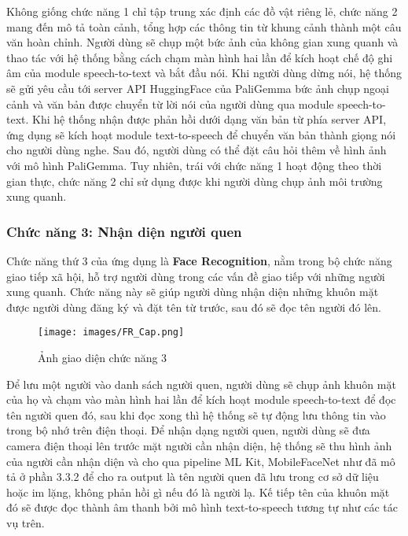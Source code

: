 \documentclass[a4paper,12pt]{article}
\begin{document}
Không giống chức năng 1 chỉ tập trung xác định các đồ vật riêng lẻ, chức năng 2 mang đến mô tả toàn cảnh, tổng hợp các thông tin từ khung cảnh thành một câu văn hoàn chỉnh. Người dùng sẽ chụp một bức ảnh của không gian xung quanh và thao tác với hệ thống bằng cách chạm màn hình hai lần để kích hoạt chế độ ghi âm của module speech-to-text và bắt đầu nói. Khi người dùng dừng nói, hệ thống sẽ gửi yêu cầu tới server API HuggingFace của PaliGemma bức ảnh chụp ngoại cảnh và văn bản được chuyển từ lời nói của người dùng qua module speech-to-text. Khi hệ thống nhận được phản hồi dưới dạng văn bản từ phía server API, ứng dụng sẽ kích hoạt module text-to-speech để chuyển văn bản thành giọng nói cho người dùng nghe. Sau đó, người dùng có thể đặt câu hỏi thêm về hình ảnh với mô hình PaliGemma. Tuy nhiên, trái với chức năng 1 hoạt động theo thời gian thực, chức năng 2 chỉ sử dụng được khi người dùng chụp ảnh môi trường xung quanh.

\subsubsection{Chức năng 3: Nhận diện người quen}
Chức năng thứ 3 của ứng dụng là \textbf{Face Recognition}, nằm trong bộ chức năng giao tiếp xã hội, hỗ trợ người dùng trong các vấn đề giao tiếp với những người xung quanh. Chức năng này sẽ giúp người dùng nhận diện những khuôn mặt được người dùng đăng ký và đặt tên từ trước, sau đó sẽ đọc tên người đó lên. 
\begin{figure}[H]
    \centering
    \texttt{[image: images/FR\_Cap.png]}
    \caption{Ảnh giao diện chức năng 3}
\end{figure}


Để lưu một người vào danh sách người quen, người dùng sẽ chụp ảnh khuôn mặt của họ và chạm vào màn hình hai lần để kích hoạt module speech-to-text để đọc tên người quen đó, sau khi đọc xong thì hệ thống sẽ tự động lưu thông tin vào trong bộ nhớ trên điện thoại. Để nhận dạng người quen, người dùng sẽ đưa camera điện thoại lên trước mặt người cần nhận diện, hệ thống sẽ thu hình ảnh của người cần nhận diện và cho qua pipeline ML Kit, MobileFaceNet như đã mô tả ở phần 3.3.2 để cho ra output là tên người quen đã lưu trong cơ sở dữ liệu hoặc im lặng, không phản hồi gì nếu đó là người lạ. Kế tiếp tên của khuôn mặt đó sẽ được đọc thành âm thanh bởi mô hình text-to-speech tương tự như các tác vụ trên.
\end{document}
